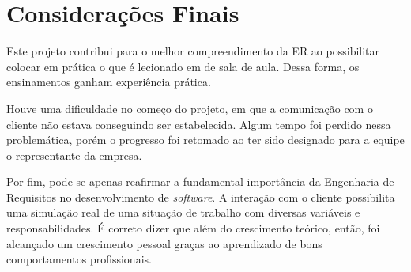 \chapter{Considerações Finais}
\label{final-consideration}

Este projeto contribui para o melhor compreendimento da ER ao possibilitar colocar em prática o que é lecionado em de sala de aula. Dessa forma, os ensinamentos ganham experiência prática.

Houve uma dificuldade no começo do projeto, em que a comunicação com o cliente não estava conseguindo ser estabelecida. Algum tempo foi perdido nessa problemática, porém o progresso foi retomado ao ter sido designado para a equipe o representante da empresa.

Por fim, pode-se apenas reafirmar a fundamental importância da Engenharia de Requisitos no desenvolvimento de \textit{software}. A interação com o cliente possibilita uma simulação real de uma situação de trabalho com diversas variáveis e responsabilidades. É correto dizer que além do crescimento teórico, então, foi alcançado um crescimento pessoal graças ao aprendizado de bons comportamentos profissionais.
